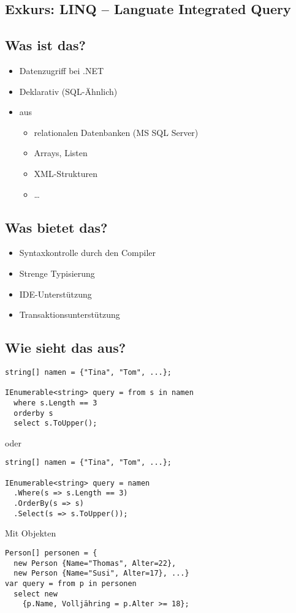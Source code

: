 \cprotEnv
\begin{beamerText}
\pagebreak
\section*{Exkurs: LINQ -- Languate Integrated Query}
\subsection*{Was ist das?}
\begin{itemize}
	\item Datenzugriff bei .NET
	\item Deklarativ (SQL-Ähnlich)
	\item aus 
	\begin{itemize}
		\item relationalen Datenbanken (MS SQL Server)
		\item Arrays, Listen
		\item XML-Strukturen
		\item \ldots
	\end{itemize}
\end{itemize}
\subsection*{Was bietet das?}
\begin{itemize}
	\item Syntaxkontrolle durch den Compiler
	\item Strenge Typisierung
	\item IDE-Unterstützung
	\item Transaktionsunterstützung
\end{itemize}
\subsection*{Wie sieht das aus?}
\begin{lstlisting}
string[] namen = {"Tina", "Tom", ...};

IEnumerable<string> query = from s in namen
  where s.Length == 3
  orderby s
  select s.ToUpper();
\end{lstlisting}
oder
\begin{lstlisting}[]
string[] namen = {"Tina", "Tom", ...};

IEnumerable<string> query = namen
  .Where(s => s.Length == 3)
  .OrderBy(s => s)
  .Select(s => s.ToUpper());
\end{lstlisting}

Mit Objekten
\begin{lstlisting}
Person[] personen = {
  new Person {Name="Thomas", Alter=22},
  new Person {Name="Susi", Alter=17}, ...}
var query = from p in personen
  select new
    {p.Name, Volljähring = p.Alter >= 18};
\end{lstlisting}

\end{beamerText}